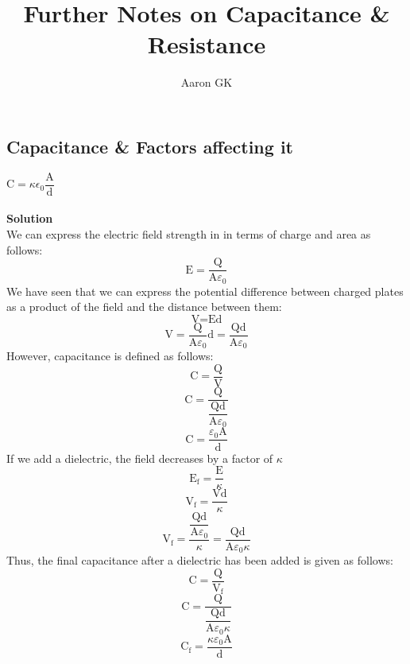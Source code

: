 \documentclass[9pt,addpoints]{exam}
\author{Aaron GK}
\begin{document}
	\title{Further Notes on Capacitance \& Resistance}
	\maketitle
	\subsection*{Capacitance \& Factors affecting it}
	$\text{C}=\kappa\epsilon_0\dfrac{\text{A}}{\text{d}}$ \\ \\ \textbf{Solution}\\
	We can express the electric field strength in in terms of charge and area as follows:
	$$\text{E}=\dfrac{\text{Q}}{\text{A}\varepsilon_0}$$
	We have seen that we can express the potential difference between charged plates as a product of the field and the distance between them:
	$$\text{V}=\text{Ed}$$
	$$\text{V}=\dfrac{\text{Q}}{\text{A}\varepsilon_0}\text{d}=\dfrac{\text{Qd}}{\text{A}\varepsilon_0}$$
	However, capacitance is defined as follows:
	$$\text{C}=\dfrac{\text{Q}}{\text{V}}$$
	$$\text{C}=\dfrac{\text{Q}}{\dfrac{\text{Qd}}{\text{A}\varepsilon_0}}$$
	$$\text{C}=\dfrac{\varepsilon_0\text{A}}{\text{d}}$$
	If we add a dielectric, the field decreases by a factor of $\kappa$
	$$\text{E}_\text{f}=\dfrac{\text{E}}{\kappa}$$
	$$\text{V}_\text{f}=\dfrac{\text{Vd}}{\kappa}$$
	$$\text{V}_\text{f}=\dfrac{\dfrac{\text{Qd}}{\text{A}\varepsilon_0}}{\kappa}=\dfrac{\text{Qd}}{\text{A}\varepsilon_0\kappa}$$
	Thus, the final capacitance after a dielectric has been added is given as follows:
	$$\text{C}=\dfrac{\text{Q}}{\text{V}_\text{f}}$$
	$$\text{C}=\dfrac{\text{Q}}{\dfrac{\text{Qd}}{\text{A}\varepsilon_0\kappa}}$$
	$$\text{C}_\text{f}=\dfrac{\kappa\varepsilon_0\text{A}}{\text{d}}$$
\end{document}
